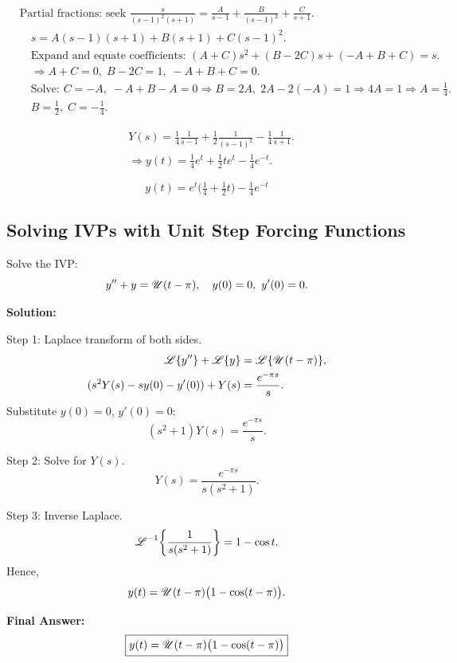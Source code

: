     \begin{align*}
      &\text{Partial fractions: seek } \frac{s}{(s-1)^2(s+1)}=\frac{A}{s-1}+\frac{B}{(s-1)^2}+\frac{C}{s+1}.\\
      &\quad s = A(s-1)(s+1) + B(s+1) + C(s-1)^2.\\
      &\quad \text{Expand and equate coefficients: }(A+C)s^2 + (B-2C)s +(-A+B+C)=s.\\
      &\quad \Rightarrow A+C=0,\; B-2C=1,\; -A+B+C=0.\\
      &\quad \text{Solve: } C=-A,\; -A + B - A =0 \Rightarrow B=2A,\; 2A -2(-A)=1 \Rightarrow 4A=1 \Rightarrow A=\tfrac14.\\
      &\quad B=\tfrac12,\; C=-\tfrac14.
    \end{align*}


  \begin{marginfigure}
    
  \end{marginfigure}


    \begin{align*}
      &Y(s)=\frac{1}{4}\frac{1}{s-1}+\frac{1}{2}\frac{1}{(s-1)^2}-\frac{1}{4}\frac{1}{s+1}.\\
      &\Rightarrow y(t)=\frac{1}{4}e^{t} + \frac{1}{2}t e^{t} - \frac{1}{4}e^{-t}.
    \end{align*}

    \[
    \boxed{\,y(t)=e^{t}\Big(\tfrac14+\tfrac12 t\Big)-\tfrac14 e^{-t}\,}
    \]


  \subsection*{Solving IVPs with Unit Step Forcing Functions}

    \begin{example}
      Solve the IVP:
      \[
      y'' + y = \operatorname{\mathscr{U}}(t-\pi), \quad y(0)=0,\ y'(0)=0.
      \]

      \textbf{Solution:}

      Step 1: Laplace transform of both sides.
      \begin{align*}
      \operatorname{\mathscr{L}}\{y''\} + \operatorname{\mathscr{L}}\{y\} &= \operatorname{\mathscr{L}}\{\operatorname{\mathscr{U}}(t-\pi)\},\\
      (s^2 Y(s) - s y(0) - y'(0)) + Y(s) &= \frac{e^{-\pi s}}{s}.
      \end{align*}
      Substitute $y(0)=0$, $y'(0)=0$:
      \[
      (s^2+1)Y(s) = \frac{e^{-\pi s}}{s}.
      \]

      Step 2: Solve for $Y(s)$.
      \[
      Y(s) = \frac{e^{-\pi s}}{s(s^2+1)}.
      \]

      Step 3: Inverse Laplace.
      \[
      \operatorname{\mathscr{L}}^{-1}\!\left\{\frac{1}{s(s^2+1)}\right\} = 1 - \cos t.
      \]
      Hence,
      \[
      y(t) = \operatorname{\mathscr{U}}(t-\pi)\big(1 - \cos(t-\pi)\big).
      \]

      \textbf{Final Answer:}
      \[
      \boxed{y(t) = \operatorname{\mathscr{U}}(t-\pi)\big(1 - \cos(t-\pi)\big)}
      \]
    \end{example}


